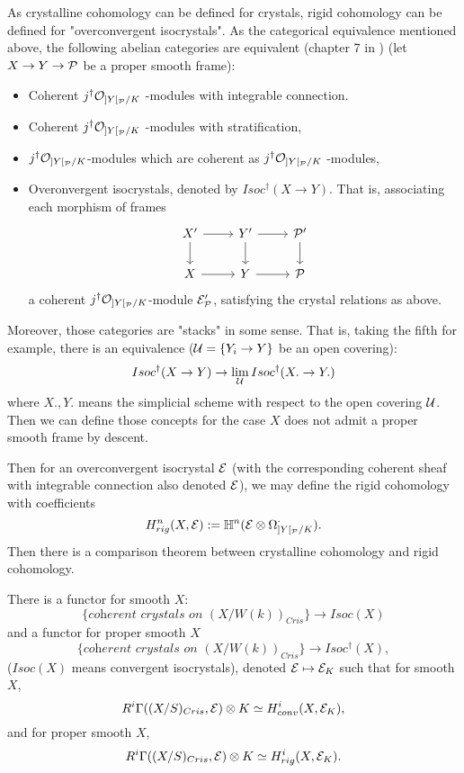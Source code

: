 As crystalline cohomology can be defined for crystals, 
rigid cohomology can be defined for "overconvergent isocrystals". 
As the categorical equivalence mentioned above, 
the following abelian categories are equivalent 
(chapter 7 in \cite{St}) (let $X \to Y \to {\mathcal {P}}$ be a proper smooth frame):
\begin{itemize}
    \item 
        Coherent $j^\dagger {\mathcal {O}}_{]Y[_{\mathcal {P}}/K}$ -modules with integrable connection.
    \item 
        Coherent $j^\dagger {\mathcal {O}}_{]Y[_{\mathcal {P}}/K}$ -modules with stratification,
    \item 
        $j^\dagger {\mathcal {O}}_{]Y[_{\mathcal {P}}/K}$-modules 
        which are coherent as $j^\dagger {\mathcal {O}}_{]Y[_{\mathcal {P}}/K}$ -modules,
    \item 
        Overonvergent isocrystals, denoted by $Isoc^\dagger(X \to Y)$. 
        That is, associating each morphism of frames
        \[
            \begin{tikzcd}
                X' \ar[r] \ar[d] & Y' \ar[r] \ar[d] & \CP' \ar[d] \\
                X \ar[r] & Y \ar[r]& \CP
            \end{tikzcd}
        \]
    a coherent $j^\dagger {\mathcal {O}}_{]Y[_{\mathcal {P}}/K}$-module ${\mathcal {E}}_{\mathcal {P}}'$, 
    satisfying the crystal relations as above.
\end{itemize}

Moreover, those categories are "stacks" in some sense. 
That is, taking the fifth for example, 
there is an equivalence (${\mathcal {U}} = \{Y_i \to Y\}$ be an open covering):
\[
    Isoc^\dagger (X \to Y) \to \lim_{{\mathcal {U}}} Isoc^\dagger (X. \to Y.)
\]
where $X.,Y.$ means the simplicial scheme with respect to the open covering ${\mathcal {U}}$. 
Then we can define those concepts for the case $X$ 
does not admit a proper smooth frame by descent.

Then for an overconvergent isocrystal ${\mathcal {E}}$ 
(with the corresponding coherent sheaf with integrable connection also denoted ${\mathcal {E}}$), 
we may define the rigid cohomology with coefficients
\[
    H^n_{rig}(X,{\mathcal {E}}) := {\mathbb {H}}^n({\mathcal {E}} \otimes \Omega_{]Y[_{\mathcal {P}}/K}^\cdot).
\]
Then there is a comparison theorem between crystalline cohomology and rigid cohomology.
\begin{theorem}
    There is a functor for smooth $X$:
    \[
        \{\textit{coherent crystals on } (X/W(k))_{Cris}\} \to Isoc(X)
    \]
    and a functor for proper smooth $X$
    \[
        \{\textit{coherent crystals on }(X/W(k))_{Cris}\} \to Isoc^\dagger(X),
    \]
    ($Isoc(X)$ means convergent isocrystals), 
    denoted ${\mathcal {E}} \mapsto {\mathcal {E}}_K$ such that for smooth $X$,
    \[
        R^i\Gamma((X/S)_{Cris}, {\mathcal {E}}) \otimes K \simeq H^i_{conv}(X, {\mathcal {E}}_K),
    \]
    and for proper smooth $X$,
    \[
        R^i\Gamma((X/S)_{Cris}, {\mathcal {E}}) \otimes K \simeq H^i_{rig}(X, {\mathcal {E}}_K).
    \]
\end{theorem}

